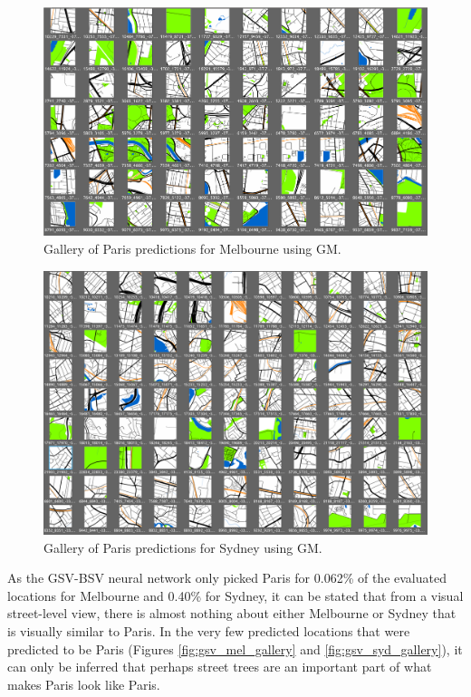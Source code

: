 \documentclass[sageh,times]{sagej}
\begin{document}
 \begin{figure}[!htbp]
 \centering    
 \includegraphics[scale=0.50]{Images/MelbourneLikeParis/Melbourne_maps_gallery.png} 
 \caption{Gallery of Paris predictions for Melbourne using GM.}    
  \label{fig:gm_mel_gallery}  
 \end{figure} 

\begin{figure}[!htbp]
\centering    
\includegraphics[scale=0.50]{Images/SydneyLikeParis/Sydney_maps_gallery.png} 
\caption{Gallery of Paris predictions for Sydney using GM.}    
 \label{fig:gm_syd_gallery}  
\end{figure} 

As the GSV-BSV neural network only picked Paris for 0.062\% of the evaluated locations for Melbourne and 0.40\% for Sydney, it can be stated that from a visual street-level view, there is almost nothing about either Melbourne or Sydney that is visually similar to Paris. In the very few predicted locations that were predicted to be Paris (Figures \ref{fig:gsv_mel_gallery} and  \ref{fig:gsv_syd_gallery}), it can only be inferred that perhaps street trees are an important part of what makes Paris look like Paris.
\end{document}
